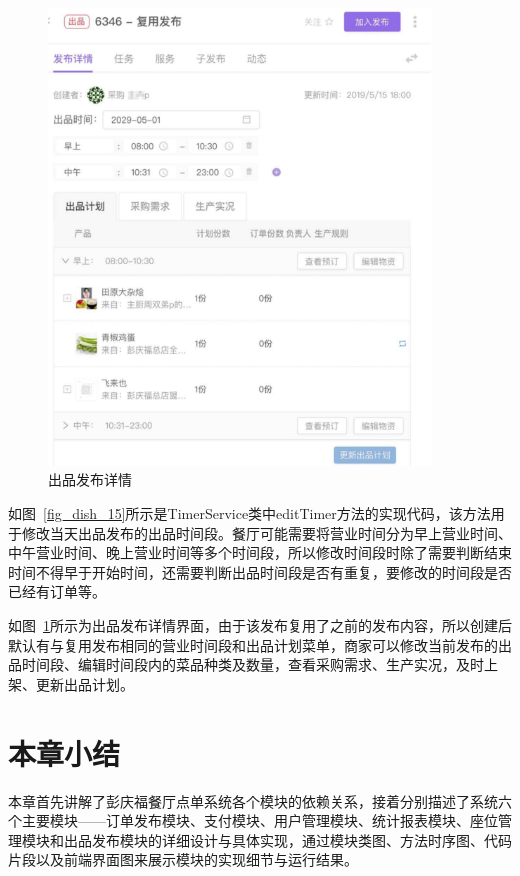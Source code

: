\begin{figure}[htbp!]
    \centering
    \includegraphics[width=4in]{FIGs/chapter4/dish_detail.pdf}
    \caption{出品发布详情}\label{fig_dish_detail}
\end{figure}

如图~\ref{fig_dish_15}所示是TimerService类中editTimer方法的实现代码，该方法用于修改当天出品发布的出品时间段。餐厅可能需要将营业时间分为早上营业时间、中午营业时间、晚上营业时间等多个时间段，所以修改时间段时除了需要判断结束时间不得早于开始时间，还需要判断出品时间段是否有重复，要修改的时间段是否已经有订单等。

如图~\ref{fig_dish_detail}所示为出品发布详情界面，由于该发布复用了之前的发布内容，所以创建后默认有与复用发布相同的营业时间段和出品计划菜单，商家可以修改当前发布的出品时间段、编辑时间段内的菜品种类及数量，查看采购需求、生产实况，及时上架、更新出品计划。\\

\section{本章小结}
本章首先讲解了彭庆福餐厅点单系统各个模块的依赖关系，接着分别描述了系统六个主要模块——订单发布模块、支付模块、用户管理模块、统计报表模块、座位管理模块和出品发布模块的详细设计与具体实现，通过模块类图、方法时序图、代码片段以及前端界面图来展示模块的实现细节与运行结果。